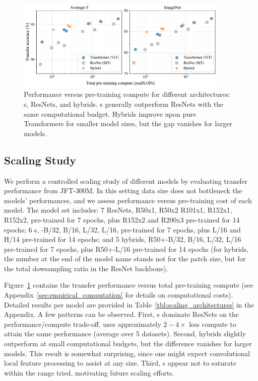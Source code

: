 \begin{figure}
\begin{center}
\includegraphics[width=0.92\textwidth]{images/finetune_vs_compute2}
\vspace{-3mm}
\end{center}
\caption{Performance versus pre-training compute for different architectures: \oursfull{}s, ResNets, and hybrids. \oursfull{}s generally outperform ResNets with the same computational budget. Hybrids improve upon pure Transformers for smaller model sizes, but the gap vanishes for larger models.}
\vspace{-3mm}
\label{fig:scaling_architectures}
\end{figure}

\subsection{Scaling Study}
\label{sec:scaling_architectures}

We perform a controlled scaling study of different models by evaluating transfer performance from JFT-300M.
In this setting data size does not bottleneck the models' performances, and we assess performance versus pre-training cost of each model.
The model set includes: 
7 ResNets, R50x1, R50x2 R101x1, R152x1, R152x2, pre-trained for 7 epochs, plus R152x2 and R200x3 pre-trained for 14 epochs;
6 \oursfull{}s, \oursabbrv-B/32, B/16, L/32, L/16, pre-trained for 7 epochs, plus L/16 and H/14 pre-trained for 14 epochs;
and 5 hybrids, R50+\oursabbrv-B/32, B/16, L/32, L/16 pre-trained for 7 epochs, plus R50+\oursabbrv-L/16 pre-trained for 14 epochs (for hybrids, the number at the end of the model name stands not for the patch size, but for the total dowsampling ratio in the ResNet backbone).

Figure~\ref{fig:scaling_architectures} contains the transfer performance versus  total pre-training compute (see  Appendix~\ref{sec:empirical_computation} for details on computational costs).
Detailed results per model are provided in Table~\ref{tbl:scaling_architectures} in the Appendix.
A few patterns can be observed.
First, \oursfull{}s dominate ResNets on the performance/compute trade-off.
\oursabbrv{} uses approximately $2-4\times$ less compute to attain the same performance (average over 5 datasets).
Second, hybrids slightly outperform \oursabbrv{} at small computational budgets, but the difference vanishes for larger models.
This result is somewhat surprising, since one might expect convolutional local feature processing to assist \oursabbrv{} at any size.
Third, \oursfull{}s appear not to saturate within the range tried, motivating future scaling efforts.



